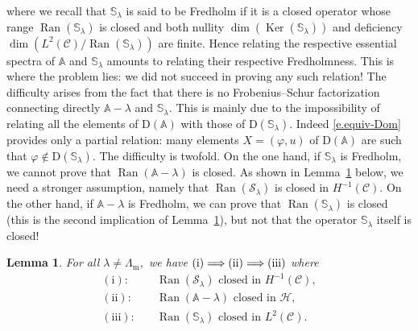 \documentclass[10pt]{amsart}
\newtheorem{lemm}[cdrthm]{Lemma}
\theoremstyle{definition}
\DeclareMathOperator{\Ker}{Ker}
\DeclareMathOperator{\Ran}{Ran}
\newcommand{\calC}{\mathcal{C}}
\newcommand{\calH}{\mathcal{H}}
\newcommand{\calS}{\mathcal{S}}
\newcommand{\bbA}{\mathbb{A}}
\newcommand{\bbS}{\mathbb{S}}
\newcommand{\rmD}{{\mathrm{D}}}
\newcommand{\Lm}{{\Lambda_{\mathrm{m}}}}
\begin{document}
where we recall that $\bbS_\lambda$ is said to be Fredholm if it is a closed operator whose range $\Ran(\bbS_\lambda)$ is closed and both nullity $\dim(\Ker(\bbS_\lambda))$ and deficiency $\dim(L^2(\calC)/\Ran(\bbS_\lambda))$ are finite. Hence relating the respective essential spectra of $\bbA$ and $\bbS_\lambda$ amounts to relating their respective Fredholmness. This is where the problem lies: we did not succeed in proving any such relation! The difficulty arises from the fact that there is no Frobenius--Schur factorization connecting directly $\bbA - \lambda$ and $\bbS_\lambda.$ This is mainly due to the impossibility of relating all the elements of $\rmD(\bbA)$ with those of $\rmD(\bbS_\lambda)$. Indeed \eqref{e.equiv-Dom} provides only a partial relation: many elements $X = (\varphi,u)$ of $\rmD(\bbA)$ are such that $\varphi \notin \rmD(\bbS_\lambda).$ The difficulty is twofold. On the one hand, if $\bbS_\lambda$ is Fredholm, we cannot prove that $\Ran(\bbA - \lambda)$ is closed. As shown in Lemma~\ref{l.ranges} below, we need a stronger assumption, namely that $\Ran(\calS_\lambda)$ is closed in $H^{-1}(\calC).$ On the other hand, if $\bbA - \lambda$ is Fredholm, we can prove that $\Ran(\bbS_\lambda)$ is closed (this is the second implication of Lemma~\ref{l.ranges}), but not that the operator $\bbS_\lambda$ itself is closed!


\begin{lemm}
For all $\lambda \neq \Lm,$ we have ${\rm (i)} \Longrightarrow {\rm (ii)} \Longrightarrow {\rm (iii)}$ where
\begin{align*}
\mathrm{(i)}: & \quad \Ran(\calS_\lambda) \text{ closed in } H^{-1}(\calC), \\
\mathrm{(ii)}: & \quad \Ran(\bbA - \lambda) \text{ closed in } \calH, \\
\mathrm{(iii)}: & \quad \Ran(\bbS_\lambda) \text{ closed in } L^2(\calC).
\end{align*}\label{l.ranges}
\end{lemm}
\end{document}
